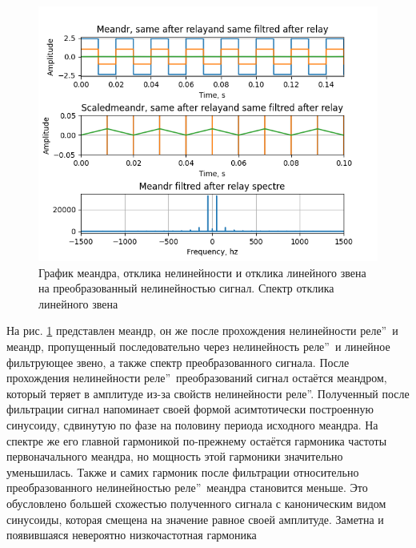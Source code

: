 \begin{figure}[H]
	\centering
	\includegraphics[width=0.95\linewidth]{body/images/meandr-after-filtred-relay-and-its-spectre.png}
	\caption{График меандра, отклика нелинейности и отклика линейного звена на преобразованный
	нелинейностью сигнал. Спектр отклика линейного звена}
	\label{fig:23}
\end{figure}

На рис. \ref{fig:23} представлен меандр, он же после прохождения
нелинейности  реле\textquotedblright\ и меандр,
пропущенный последовательно через нелинейность
 реле\textquotedblright\ и 
линейное фильтрующее звено, а также спектр преобразованного сигнала.
После прохождения нелинейности  реле\textquotedblright\
преобразований сигнал остаётся меандром, который теряет в амплитуде из-за 
свойств нелинейности \textquotedblleftИдеальное реле\textquotedblright.
Полученный после фильтрации сигнал напоминает своей формой асимтотически
построенную синусоиду, сдвинутую по фазе на половину периода исходного меандра.
На спектре же его главной гармоникой по-прежнему остаётся гармоника частоты
первоначального меандра, но мощность этой гармоники значительно уменьшилась.
Также и самих гармоник после фильтрации относительно преобразованного нелинейностью
\textquotedblleftИдеальное реле\textquotedblright\ меандра становится
меньше. Это обусловлено большей схожестью полученного сигнала с каноническим
видом синусоиды, которая смещена на значение равное своей амплитуде.
Заметна и появившаяся невероятно низкочастотная гармоника

